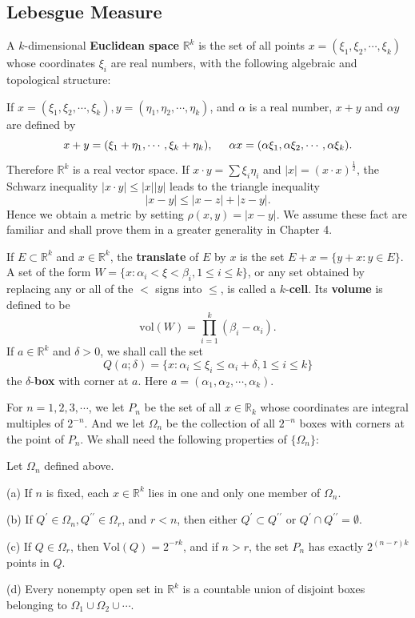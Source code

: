 \subsection{Lebesgue Measure}
A $k$-dimensional \textbf{Euclidean space} $\mathbb{R}^k$ is the set of all points $x=(\xi_1,\xi_2,\cdots,\xi_k)$ whose coordinates $\xi_i$ are real numbers, with the following algebraic and topological structure:\par
If $x=(\xi_1,\xi_2,\cdots,\xi_k),y=(\eta_1,\eta_2,\cdots,\eta_k)$, and $\alpha$ is a real number, $x+y$ and $\alpha y$ are defined by 
$$x+y=(\xi_1+\eta_1,\cdots,\xi_k+\eta_k),\hspace{0.5cm}\alpha x=(\alpha\xi_1,\alpha\xi_2,\cdots,\alpha\xi_k).$$
Therefore $\mathbb{R}^k$ is a real vector space. If $x\cdot y=\sum\xi_i\eta_i$ and $|x|=(x\cdot x)^{\frac{1}{2}}$, the Schwarz inequality $|x\cdot y|\le|x||y|$ leads to the triangle inequality 
$$|x-y|\le|x-z|+|z-y|.$$
Hence we obtain a metric by setting $\rho(x,y)=|x-y|$. We assume these fact are familiar and shall prove them in a greater generality in Chapter 4.\par
If $E\subset\mathbb{R}^k$ and $x\in\mathbb{R}^k$, the \textbf{translate} of $E$ by $x$ is the set $E+x=\{y+x:y\in E\}$. A set of the form $W=\{x:\alpha_i<\xi<\beta_i,1\le i\le k\}$, or any set obtained by replacing any or all of the $<$ signs into $\le$, is called a $k$-\textbf{cell}. Its \textbf{volume} is defined to be 
$$\mathrm{vol}(W)=\prod_{i=1}^k(\beta_i-\alpha_i).$$
If $a\in\mathbb{R}^k$ and $\delta>0$, we shall call the set 
$$Q(a;\delta)=\{x:\alpha_i\le\xi_i\le\alpha_i+\delta,1\le i\le k\}$$
the $\delta$-\textbf{box} with corner at $a$. Here $a=(\alpha_1,\alpha_2,\cdots,\alpha_k)$.\par
For $n=1,2,3,\cdots$, we let $P_n$ be the set of all $x\in\mathbb{R}_k$ whose coordinates are integral multiples of $2^{-n}$. And we let $\Omega_n$ be the collection of all $2^{-n}$ boxes with corners at the point of $P_n$. We shall need the following properties of $\{\Omega_n\}$:
\begin{proposition}
Let $\Omega_n$ defined above.\par
(a) If $n$ is fixed, each $x\in\mathbb{R}^k$ lies in one and only one member of $\Omega_n$.\par
(b) If $Q^\prime\in\Omega_n,Q^{\prime\prime}\in\Omega_r$, and $r<n$, then either $Q^\prime\subset Q^{\prime\prime}$ or $Q^\prime\cap Q^{\prime\prime}=\emptyset$.\par
(c) If $Q\in\Omega_r$, then $\mathrm{Vol}(Q)=2^{-rk}$, and if $n>r$, the set $P_n$ has exactly $2^{(n-r)k}$ points in $Q$.\par
(d) Every nonempty open set in $\mathbb{R}^k$ is a countable union of disjoint boxes belonging to $\Omega_1\cup\Omega_2\cup\cdots$.
\end{proposition}

